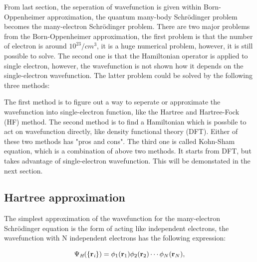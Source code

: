 \documentclass[a4paper, 12pt, titlepage,oneside,drop]{kthesis}
\begin{document}
\noindent From last section, the seperation of wavefunction is given within Born-Oppenheimer approximation, the quantum many-body Schrödinger problem becomes the many-electron 
Schrödinger problem. There are two major problems from the Born-Oppenheimer approximation, the first problem is that the number of electron is around $10^{23}/cm^3$, it is a huge numerical problem, however, it is still possible to solve.
The second one is that the Hamiltonian operator is applied to single electron, however, the wavefunction is not shown how it depends on the single-electron wavefunction. The latter problem 
could be solved by the following three methods:

The first method is to figure out a way to seperate or approximate the wavefunction into single-electron function, like the Hartree and Hartree-Fock (HF) method. The second method is to
find a Hamiltonian which is possbile to act on wavefunction directly, like density functional theory (DFT). Either of these two methods has "pros and cons". The third one is called Kohn-Sham equation,
which is a combination of above two methods. It starts from DFT, but takes advantage of single-electron wavefunction. This will be demonstated in the next section.



\subsection{Hartree approximation}
\label{ha}
\noindent The simplest approximation of the wavefunction for the many-electron Schrödinger equation is the form of acting like independent
electrons, the wavefunction with N independent electrons has the following expression:

\begin{equation}\label{wfh}
\wfh = \bwf<1><1> \bwf<2><2> \cdots \bwf<N><N>, 
\end{equation}
\end{document}
